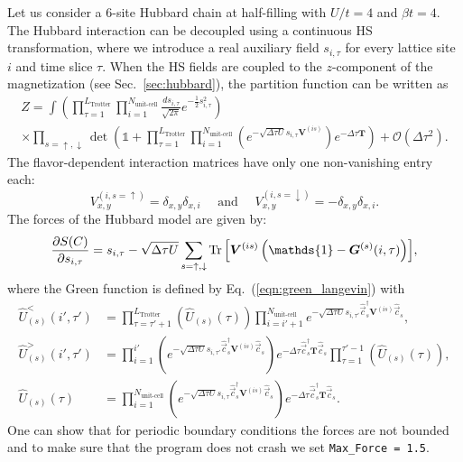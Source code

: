 Let us consider a 6-site Hubbard chain at half-filling with $U/t = 4$ and  $\beta t = 4$.
The Hubbard interaction can be decoupled using a continuous HS transformation, where we introduce a real auxiliary field $s_{i,\tau}$ for every lattice site $i$ and time slice $\tau$. When the HS fields are coupled to the $z$-component of the magnetization (see Sec.~\ref{sec:hubbard}), the partition function can be written as
\begin{multline}
Z = \int \left( \prod_{\tau=1}^{L_{\text{Trotter}}} \prod_{i=1}^{N_{\text{unit-cell}} } \frac{d s_{i,\tau}}{\sqrt{2 \pi}} e^{-\frac{1}{2} s_{i,\tau}^2 } \right)  \\
\times \prod_{s=\uparrow, \downarrow} \det \left(  \mathds{1} + \prod_{\tau=1}^{L_{\mathrm{Trotter}}}    \prod_{i=1}^{N_{\text{unit-cell}}} \left( e^{-\sqrt{\Delta \tau U}s_{i,\tau} \bm{V}^{(is)}} \right) e^{-\Delta \tau \bm{T}} \right) + \mathcal{O}(\Delta\tau^{2}).
\end{multline}
The flavor-dependent interaction matrices have only one non-vanishing entry each: \begin{equation*}
V_{x,y}^{(i,s=\uparrow)}=\delta_{x,y}\delta_{x,i} \quad \text{ and } \quad V_{x,y}^{(i,s=\downarrow)}=-\delta_{x,y}\delta_{x,i}.
\end{equation*} 
The forces of the Hubbard model are given by:
\begin{equation}
\frac { \partial S(C)}{\partial s_{i,\tau} } = s_{i,\tau} - \sqrt{\Delta \tau U} \sum\limits_{s=\uparrow, \downarrow} \Tr{\left[ \bm{V}^{(is)}\left(\mathds{1} - \bm{G}^{(s)}(i,\tau) \right) \right]} ,
\end{equation}
where the Green function is defined by Eq.~(\ref{eqn:green_langevin}) with
\begin{align}
 \hat{U}_{(s)}^{<}(i',\tau') &= \prod_{\tau=\tau'+1}^{L_{\text{Trotter}}}  \left( \hat{U}_{(s)}(\tau) \right)
\prod_{i=i'+1}^{N_{\text{unit-cell}} } e^{-\sqrt{\Delta\tau U}  s_{i,\tau'} \hat{\vec{c}}_{s}^{\dagger} \bm{V}^{(is)} \hat{\vec{c}}_{s}^{\phantom\dagger}}, \\
 \hat{U}_{(s)}^{>}(i',\tau') &= \prod_{i=1}^{i'}\left( e^{-\sqrt{\Delta\tau U}  s_{i,\tau'} \hat{\vec{c}}_{s}^{\dagger} \bm{V}^{(is)} \hat{\vec{c}}_{s}^{\phantom\dagger}} \right)
    e^{-\Delta\tau  \hat{\vec{c}}_{s}^{\dagger} \bm{T} \hat{\vec{c}}_{s}^{\phantom\dagger}} 
  \prod_{\tau=1}^{\tau'-1}  \left( \hat{U}_{(s)}(\tau) \right), \\
  \hat{U}_{(s)}(\tau) &=  \prod_{i=1}^{N_{\text{unit-cell}} } \left(e^{-\sqrt{\Delta\tau U}  s_{i,\tau} \hat{\vec{c}}_{s}^{\dagger} \bm{V}^{(is)} \hat{\vec{c}}_{s}^{\phantom\dagger}} \right)
   e^{-\Delta\tau  \hat{\vec{c}}_{s}^{\dagger} \bm{T} \hat{\vec{c}}_{s}^{\phantom\dagger}} .
\end{align}
One can show that for periodic boundary conditions the   forces are not bounded 
and to make sure that the program does not crash we set \texttt{Max\_Force = 1.5}.\\

